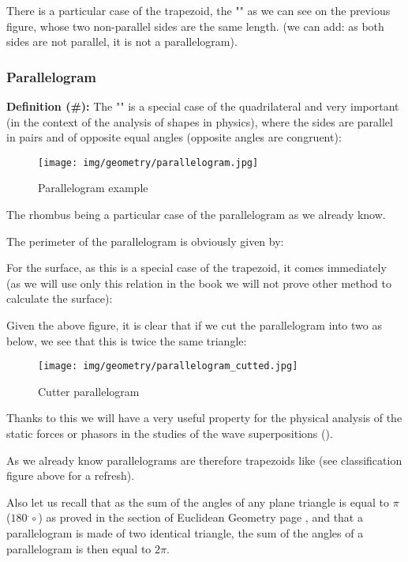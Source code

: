 {	\begin{tcolorbox}[title=Remark,colframe=black,arc=10pt]
	There is a particular case of the trapezoid, the "" as we can see on the previous figure, whose two non-parallel sides are the same length. (we can add: as both sides are not parallel, it is not a parallelogram).
	\end{tcolorbox}
	
	\subsubsection{Parallelogram}\label{parallelogram}
	\textbf{Definition (\#\mydef):} The "" is a special case of the quadrilateral and very important (in the context of the analysis of shapes in physics), where the sides are parallel in pairs and of opposite equal angles (opposite angles are congruent):
	\begin{figure}[H]
		\centering
		\texttt{[image: img/geometry/parallelogram.jpg]}
		\caption{Parallelogram example}
	\end{figure}
	The rhombus being a particular case of the parallelogram as we already know.
	
	The perimeter of the parallelogram is obviously given by:
	
	For the surface, as this is a special case of the trapezoid, it comes immediately (as we will use only this relation in the book we will not prove other method to calculate the surface):
	
	Given the above figure, it is clear that if we cut the parallelogram into two as below, we see that this is twice the same triangle:
	\begin{figure}[H]
		\centering
		\texttt{[image: img/geometry/parallelogram\_cutted.jpg]}
		\caption{Cutter parallelogram}
	\end{figure}
	Thanks to this we will have a very useful property for the physical analysis of the static forces or phasors in the studies of the wave superpositions ().
	
	\begin{tcolorbox}[title=Remark,colframe=black,arc=10pt]
	As we already know parallelograms are therefore trapezoids like (see classification figure above for a refresh).
	\end{tcolorbox}	
	Also let us recall that as  the sum of the angles of any plane triangle is equal to $\pi$ ($180^.\circ$) as proved in the section of Euclidean Geometry page \pageref{angle sum theorem}, and that a parallelogram is made of two identical triangle, the sum of the angles of a parallelogram is then equal to $2\pi$.
	
}

